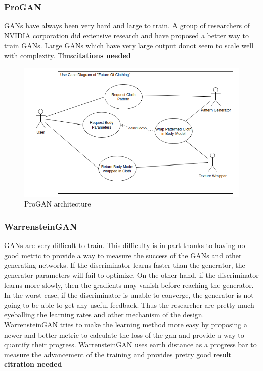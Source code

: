 \documentclass{article}
\begin{document}
\subsubsection{ProGAN}
GANs have always been very hard and large to train. A group of researchers of NVIDIA corporation did extensive research and have proposed a better way to train GANs. Large GANs which have very large output donot seem to scale well with complexity. Thus\textbf{citations needed}
\begin{figure}[h]
    \includegraphics[scale=0.5]{images/softwareDiagrams/FinalSystemUseCase.png}
    \centering
    \caption{ProGAN architecture}    
\end{figure}

\subsubsection{WarrensteinGAN}
GANs are very difficult to train. This difficulty is in part thanks to having no good metric to provide a way to measure the success of the GANs and other generating networks. If the discriminator learns faster than the generator, the generator parameters will fail to optimize. On the other hand, if the discriminator learns more slowly, then the gradients may vanish before reaching the generator. In the worst
case, if the discriminator is unable to converge, the generator is not going to be able to get any useful feedback. Thus the researcher are pretty much eyeballing the learning rates and other mechanism of the design. WarrensteinGAN tries to make the learning method more easy by proposing a newer and better metric to calculate the loss of the gan and provide a way to quantify their progress. WarrensteinGAN uses earth distance as a progress bar to measure the advancement of the training and provides pretty good result \textbf{citration needed}
\break
\end{document}
